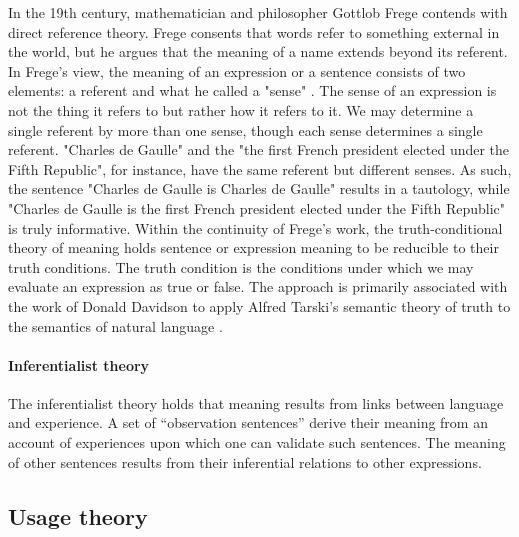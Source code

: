 In the 19th century, mathematician and philosopher Gottlob Frege contends with direct reference theory. Frege consents that words refer to something external in the world, but he argues that the meaning of a name extends beyond its referent. In Frege's view, the meaning of an expression or a sentence consists of two elements: a referent and what he called a "sense" \parencite{frege_1892}. The sense of an expression is not the thing it refers to but rather how it refers to it. We may determine a single referent by more than one sense, though each sense determines a single referent. "Charles de Gaulle" and the "the first French president elected under the Fifth Republic", for instance, have the same referent but different senses. As such, the sentence "Charles de Gaulle is Charles de Gaulle" results in a tautology, while "Charles de Gaulle is the first French president elected under the Fifth Republic" is truly informative.
Within the continuity of Frege's work, the truth-conditional theory of meaning holds sentence or expression meaning to be reducible to their truth conditions. The truth condition is the conditions under which we may evaluate an expression as true or false. The approach is primarily associated with the work of Donald Davidson to apply Alfred Tarski's semantic theory of truth to the semantics of natural language \parencite{davidson_67}.



\paragraph{Inferentialist theory} The inferentialist theory holds that meaning results from links between language and experience. A set of “observation sentences” derive their meaning from an account of experiences upon which one can validate such sentences. The meaning of other sentences results from their inferential relations to other expressions.


\subsection{Usage theory}

